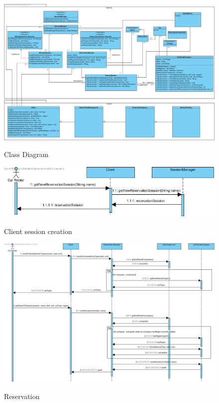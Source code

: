 \documentclass[]{article}
\begin{document}
{\begin{figure}[h]
		\caption{Class Diagram}
		\includegraphics[width=1\textwidth]{classdiagram}
		\label{fig:class}
	\end{figure}
\clearpage
{\begin{figure}[h]
		\caption{Client session creation}
		\includegraphics[width=1\textwidth]{clientseq}
		\label{fig:client}
	\end{figure}
{\begin{figure}[h]
		\caption{Reservation}
		\includegraphics[width=1\textwidth]{reservationseq}
		\label{fig:reservation}

\end{figure}}}}
\end{document}
